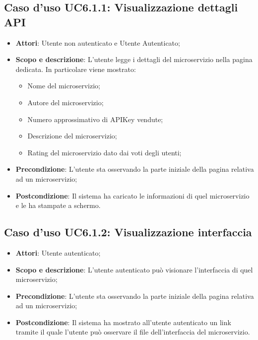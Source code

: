 \documentclass[12pt,a4paper,titlepage]{article}
\begin{document}
	\subsection{Caso d'uso UC6.1.1: Visualizzazione dettagli API}
	\label{UC6.1.1}
	\begin{itemize}
		\item \textbf{Attori}: Utente non autenticato e Utente Autenticato;
		\item \textbf{Scopo e descrizione}: L'utente legge i dettagli del microservizio nella pagina dedicata. In particolare viene mostrato:
		\begin{itemize}
			\item Nome del microservizio;
			\item Autore del microservizio;
			\item Numero approssimativo di APIKey vendute;
			\item Descrizione del microservizio;
			\item Rating del microservizio dato dai voti degli utenti;
		\end{itemize}
		\item \textbf{Precondizione}: L'utente sta osservando la parte iniziale della pagina relativa ad un microservizio;
		\item \textbf{Postcondizione}: Il sistema ha caricato le informazioni di quel microservizio e le ha stampate a schermo.
	\end{itemize}
	\subsection{Caso d'uso UC6.1.2: Visualizzazione interfaccia}
	\label{UC6.1.2}
	\begin{itemize}
		\item \textbf{Attori}: Utente autenticato;
		\item \textbf{Scopo e descrizione}: L'utente autenticato può visionare l'interfaccia di quel microservizio;
		\item \textbf{Precondizione}: L'utente sta osservando la parte iniziale della pagina relativa ad un microservizio;
		\item \textbf{Postcondizione}: Il sistema ha mostrato all'utente autenticato un link tramite il quale l'utente può osservare il file dell'interfaccia del microservizio.
	\end{itemize}
\end{document}
